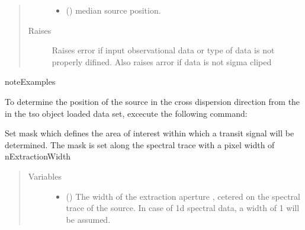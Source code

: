 \documentclass[a4paper,10pt,english]{sphinxmanual}
\begin{document}
\begin{fulllineitems}
\begin{fulllineitems}
\begin{quote}
\begin{description}
\begin{itemize}
\item {} 
 () \textendash{} median source position.

\end{itemize}

\item[{Raises}] \leavevmode
{} \textendash{} Raises error if input observational data or type of data is
not properly difined. Also raises arror if data is not sigma cliped

\end{description}\end{quote}

\begin{sphinxadmonition}{note}{Examples}

To determine the position of the source in the cross dispersion
direction from the in the tso object loaded data set, excecute the
following command:

%
\begin{sphinxVerbatim}[commandchars=\\\{\}]
\end{sphinxVerbatim}
\end{sphinxadmonition}

\end{fulllineitems}


\begin{fulllineitems}
\label{\detokenize{cascade.TSO:cascade.TSO.TSO.TSOSuite.set_extraction_mask}}
Set mask which defines the area of interest within which
a transit signal will be determined. The mask is set along the
spectral trace with a pixel width of nExtractionWidth
\begin{quote}\begin{description}
\item[{Variables}] \leavevmode\begin{itemize}
\item {} 
 () \textendash{} The width of the extraction aperture , cetered on the
spectral trace of the source. In case of 1d spectral data, a
width of 1 will be assumed.


\end{itemize}
\end{description}
\end{quote}
\end{fulllineitems}
\end{fulllineitems}
\end{document}
